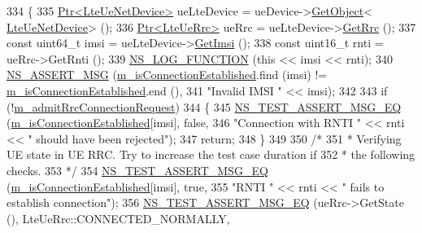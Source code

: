 \begin{DoxyCode}
334 \{
335   \hyperlink{classns3_1_1Ptr}{Ptr<LteUeNetDevice>} ueLteDevice = ueDevice->\hyperlink{classns3_1_1Object_a13e18c00017096c8381eb651d5bd0783}{GetObject}<
      \hyperlink{classns3_1_1LteUeNetDevice}{LteUeNetDevice}> ();
336   \hyperlink{classns3_1_1Ptr}{Ptr<LteUeRrc>} ueRrc = ueLteDevice->\hyperlink{classns3_1_1LteUeNetDevice_a1f84e8e99aeb10f4242bbfc7b57a8128}{GetRrc} ();
337   \textcolor{keyword}{const} uint64\_t imsi = ueLteDevice->\hyperlink{classns3_1_1LteUeNetDevice_a673405bfed4b45c5714f17b0c3bad334}{GetImsi} ();
338   \textcolor{keyword}{const} uint16\_t rnti = ueRrc->GetRnti ();
339   \hyperlink{log-macros-disabled_8h_a90b90d5bad1f39cb1b64923ea94c0761}{NS\_LOG\_FUNCTION} (\textcolor{keyword}{this} << imsi << rnti);
340   \hyperlink{assert_8h_aff5ece9066c74e681e74999856f08539}{NS\_ASSERT\_MSG} (\hyperlink{classLteRrcConnectionEstablishmentTestCase_a1516a2a155242462521febbc223b6cfb}{m\_isConnectionEstablished}.find (imsi) != 
      \hyperlink{classLteRrcConnectionEstablishmentTestCase_a1516a2a155242462521febbc223b6cfb}{m\_isConnectionEstablished}.end (),
341                  \textcolor{stringliteral}{"Invalid IMSI "} << imsi);
342 
343   \textcolor{keywordflow}{if} (!\hyperlink{classLteRrcConnectionEstablishmentTestCase_a2e3935f73414ffa68b957ee7f83eb8e2}{m\_admitRrcConnectionRequest})
344     \{
345       \hyperlink{group__testing_ga2a9d78cffb3db8e867c35fff0b698cf5}{NS\_TEST\_ASSERT\_MSG\_EQ} (\hyperlink{classLteRrcConnectionEstablishmentTestCase_a1516a2a155242462521febbc223b6cfb}{m\_isConnectionEstablished}[imsi],
       \textcolor{keyword}{false},
346                              \textcolor{stringliteral}{"Connection with RNTI "} << rnti << \textcolor{stringliteral}{" should have been rejected"});
347       \textcolor{keywordflow}{return};
348     \}
349 
350   \textcolor{comment}{/*}
351 \textcolor{comment}{   * Verifying UE state in UE RRC. Try to increase the test case duration if}
352 \textcolor{comment}{   * the following checks.}
353 \textcolor{comment}{   */}
354   \hyperlink{group__testing_ga2a9d78cffb3db8e867c35fff0b698cf5}{NS\_TEST\_ASSERT\_MSG\_EQ} (\hyperlink{classLteRrcConnectionEstablishmentTestCase_a1516a2a155242462521febbc223b6cfb}{m\_isConnectionEstablished}[imsi], \textcolor{keyword}{
      true},
355                          \textcolor{stringliteral}{"RNTI "} << rnti << \textcolor{stringliteral}{" fails to establish connection"});
356   \hyperlink{group__testing_ga2a9d78cffb3db8e867c35fff0b698cf5}{NS\_TEST\_ASSERT\_MSG\_EQ} (ueRrc->GetState (), LteUeRrc::CONNECTED\_NORMALLY,

\end{DoxyCode}
